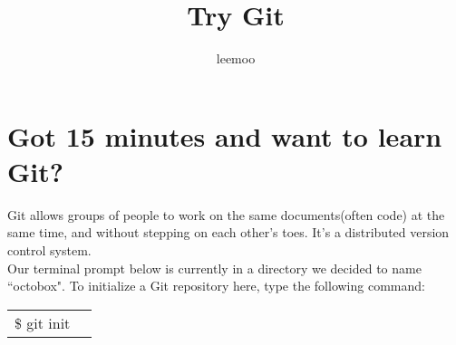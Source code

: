 \documentclass{article}
\title{Try Git}
\author{\Large leemoo}
\begin{document}
\maketitle
\tableofcontents

\section{Got 15 minutes and want to learn Git?}
\begin{minipage}[c]{0.66\textwidth}
	\parbox{\textwidth}{
	Git allows groups of people to work on the same documents(often code) at the same time, and without stepping on each other's toes. It's a distributed version control system. \\
	Our terminal prompt below is currently in a directory we decided to name ``octobox". To initialize a Git repository here, type the following command: \\%
	}
\hfill
\begin{tabular}{ll}
\rowcolor{lightgray} \$ git init \\
\end{tabular}%
\end{minipage}
\hfill
\begin{minipage}[c]{0.32\textwidth }
\end{minipage} 
\end{document}
